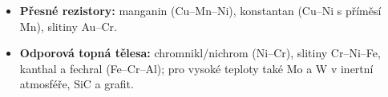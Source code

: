 \begin{itemize}
\item \textbf{Přesné rezistory:} manganin (Cu--Mn--Ni), konstantan (Cu--Ni s příměsí Mn), slitiny Au--Cr.
\item \textbf{Odporová topná tělesa:} chromnikl/nichrom (Ni--Cr), slitiny Cr--Ni--Fe, kanthal a fechral (Fe--Cr--Al); pro vysoké teploty také Mo a W v inertní atmosféře, SiC a grafit.
\end{itemize}
